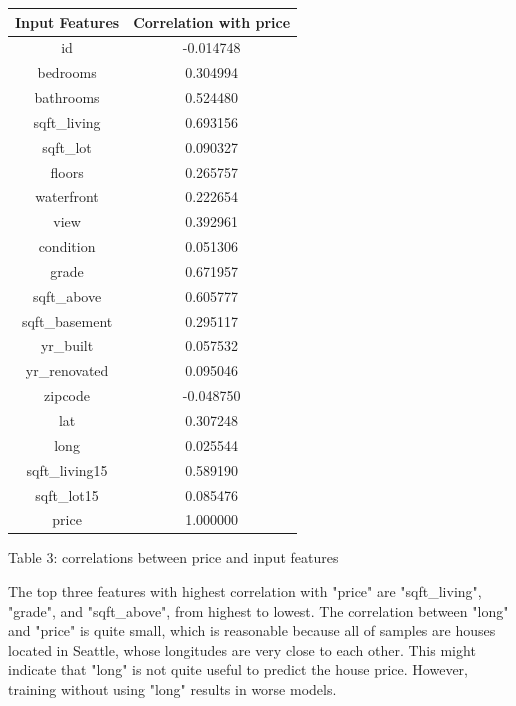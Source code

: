 \documentclass[12pt,article]{article}
\begin{document}
\begin{center}
    \begin{tabular}{ |c|c|} 
        \hline
        Input Features & Correlation with price \\
        \hline
        id            & -0.014748 \\
        bedrooms      &  0.304994 \\
        bathrooms     &  0.524480 \\
        sqft\_living   &  0.693156 \\
        sqft\_lot      &  0.090327 \\
        floors        &  0.265757 \\
        waterfront    &  0.222654 \\
        view          &  0.392961 \\
        condition     &  0.051306 \\
        grade         &  0.671957 \\
        sqft\_above    &  0.605777 \\
        sqft\_basement &  0.295117 \\
        yr\_built      &  0.057532 \\
        yr\_renovated  &  0.095046 \\
        zipcode       & -0.048750 \\
        lat           &  0.307248 \\
        long          &  0.025544 \\
        sqft\_living15 &  0.589190 \\
        sqft\_lot15    &  0.085476 \\
        price         &  1.000000 \\
        \hline
    \end{tabular}
    
    Table 3: correlations between price and input features
\end{center}

The top three features with highest correlation with "price" are "sqft\_living", 
"grade", and "sqft\_above", from highest to lowest.
The correlation between "long" and "price" is quite small, which is reasonable 
because all of samples are houses located in Seattle, whose longitudes are very 
close to each other. This might indicate that "long" is not quite useful to 
predict the house price. However, training without using "long" results in 
worse models.
\end{document}
